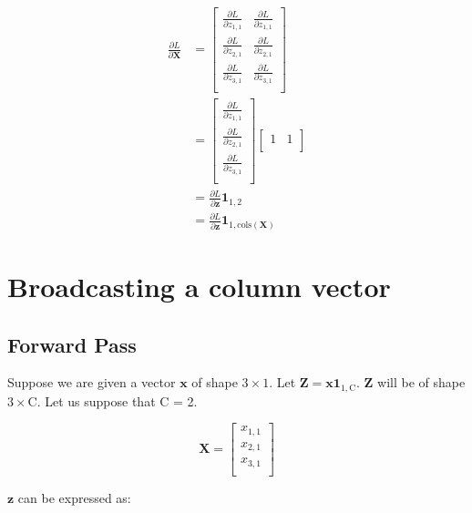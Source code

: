 \documentclass{article}
\newcommand{\vecr}[1]{\bm{#1}}
\newcommand{\matr}[1]{\mathbf{#1}} %
\begin{document}
\begin{align}
\frac{\partial L}{\partial \matr{X}} &=
\begin{bmatrix}
\frac{\partial L}{\partial z_{1,1}} &
\frac{\partial L}{\partial z_{1,1}} \\[0.7em]
\frac{\partial L}{\partial z_{2,1}} &
\frac{\partial L}{\partial z_{2,1}} \\[0.7em]
\frac{\partial L}{\partial z_{3,1}} &
\frac{\partial L}{\partial z_{3,1}} \\[0.7em]
\end{bmatrix} \nonumber
\\
&=
\begin{bmatrix}
\frac{\partial L}{\partial z_{1,1}} \\[0.7em]
\frac{\partial L}{\partial z_{2,1}} \\[0.7em]
\frac{\partial L}{\partial z_{3,1}} \\[0.7em]
\end{bmatrix}
\begin{bmatrix}
1 & 1 \\%
\end{bmatrix} \nonumber
\\
&=
\frac{\partial L}{\partial \vecr{z}} \mathbf{1}_{1,2} \nonumber
\\
&=
\frac{\partial L}{\partial \vecr{z}} \mathbf{1}_{1, \text{cols}(\matr{X})}
\end{align}

\section{Broadcasting a column vector}
\subsection{Forward Pass}
Suppose we are given a vector $\vecr{x}$ of shape $3 \times 1$. Let $\matr{Z} = \vecr{x} \mathbf{1}_{1,\text{C}}$. $\matr{Z}$ will be of shape $3 \times \text{C}$. Let us suppose that C = 2.

\begin{displaymath}
\matr{X} =
\begin{bmatrix}
x_{1,1} \\%
x_{2,1} \\%
x_{3,1} \\%
\end{bmatrix}
\end{displaymath}

$\vecr{z}$ can be expressed as:
\end{document}
